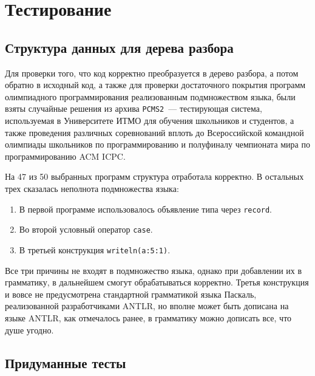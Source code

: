 \chapter{Тестирование}

\section{Структура данных для дерева разбора}
Для проверки того, что код корректно преобразуется в дерево разбора, а потом обратно в исходный код, а также
для проверки достаточного покрытия программ олимпиадного программирования реализованным подмножеством языка,
были взяты случайные решения из архива \texttt{PCMS2}~--- тестирующая система, используемая в Университете ИТМО
для обучения школьников и студентов, а также проведения различных соревнований вплоть до Всероссийской командной
олимпиады школьников по программированию и полуфиналу чемпионата мира по программированию ACM ICPC.

На 47 из 50 выбранных программ структура отработала корректно. В остальных трех сказалась неполнота подмножества языка:
\begin{enumerate}
    \item В первой программе использовалось объявление типа через \texttt{record}.
    \item Во второй условный оператор \texttt{case}.
    \item В третьей конструкция \texttt{writeln(a:5:1)}.
\end{enumerate}
Все три причины не входят в подмножество языка, однако при добавлении их в грамматику, в дальнейшем смогут обрабатываться корректно.
Третья конструкция и вовсе не предусмотрена стандартной грамматикой языка Паскаль, реализованной разработчиками ANTLR, но вполне
может быть дописана на языке ANTLR, как отмечалось ранее, в грамматику можно дописать все, что душе угодно.

\section{Придуманные тесты}
